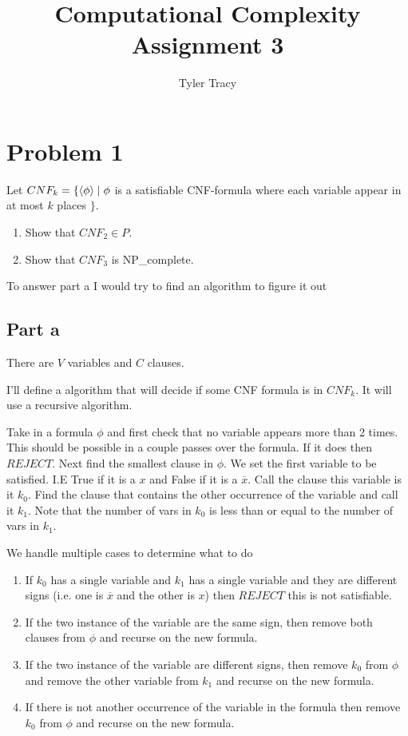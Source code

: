 \documentclass[12pt]{article}
\title{Computational Complexity Assignment 3}
\author{Tyler Tracy}
\begin{document}
\maketitle


\section*{Problem 1}

\begin{questionbox}
	Let $CNF_k = \{ \braket{\phi} \mid \phi$ is a satisfiable CNF-formula where each variable appear in at most $k$ places $\}$.
	\begin{enumerate}[label=(\alph*)]
		\item Show that $CNF_2 \in P$.
		\item Show that $CNF_3$ is NP\_complete.
	\end{enumerate}
\end{questionbox}


To answer part a I would try to find an algorithm to figure it out

\subsection*{Part a}

There are $V$ variables and $C$ clauses.

I'll define a algorithm that will decide if some CNF formula is in $CNF_k$. It will use a recursive algorithm.


Take in a formula $\phi$ and first check that no variable appears more than 2 times. This should be possible in a couple passes over the formula. If it does then $REJECT$. Next find the smallest clause in $\phi$. We set the first variable to be satisfied. I.E True if it is a $x$ and False if it is a $\overline{x}$. Call the clause this variable is it $k_0$. Find the clause that contains the other occurrence of the variable and call it $k_1$. Note that the number of vars in $k_0$ is less than or equal to the number of vars in $k_1$.

We handle multiple cases to determine what to do

\begin{enumerate}
	\item If $k_0$ has a single variable and $k_1$ has a single variable and they are different signs (i.e. one is $\overline{x}$ and the other is $x$) then $REJECT$ this is not satisfiable.
	\item If the two instance of the variable are the same sign, then remove both clauses from $\phi$ and recurse on the new formula.
	\item If the two instance of the variable are different signs, then remove $k_0$ from $\phi$ and remove the other variable from $k_1$ and recurse on the new formula.
	\item If there is not another occurrence of the variable in the formula then remove $k_0$ from $\phi$ and recurse on the new formula.

\end{enumerate}
\end{document}
